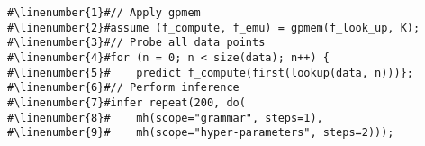 \begin{mdframed}
\begin{minipage}{\linewidth}
\small
\belowcaptionskip=-10pt
\begin{lstlisting}[mathescape,label=alg:structureVent,basicstyle=\selectfont\ttfamily,numbers=none,caption={\gpmem\
inference for structure
learning: },escapechar=\#]
#\linenumber{1}#// Apply gpmem 
#\linenumber{2}#assume (f_compute, f_emu) = gpmem(f_look_up, K);
#\linenumber{3}#// Probe all data points
#\linenumber{4}#for (n = 0; n < size(data); n++) { 
#\linenumber{5}#	predict f_compute(first(lookup(data, n)))};
#\linenumber{6}#// Perform inference
#\linenumber{7}#infer repeat(200, do(
#\linenumber{8}#	mh(scope="grammar", steps=1),
#\linenumber{9}#	mh(scope="hyper-parameters", steps=2)));
\end{lstlisting}

\end{minipage}
\end{mdframed}
